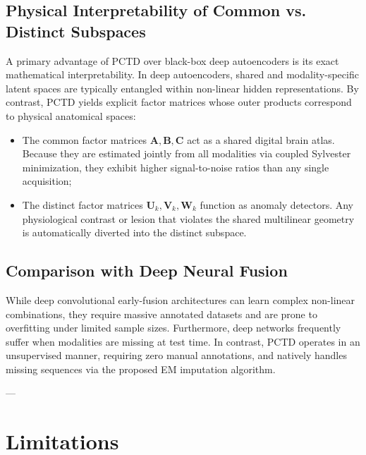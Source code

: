 \documentclass[11pt,a4paper]{article}
\begin{document}
\subsection{Physical Interpretability of Common vs. Distinct Subspaces}
A primary advantage of PCTD over black-box deep autoencoders is its exact mathematical interpretability. In deep autoencoders, shared and modality-specific latent spaces are typically entangled within non-linear hidden representations. By contrast, PCTD yields explicit factor matrices whose outer products correspond to physical anatomical spaces:
\begin{itemize}
    \item The common factor matrices $\mathbf{A}, \mathbf{B}, \mathbf{C}$ act as a shared digital brain atlas. Because they are estimated jointly from all modalities via coupled Sylvester minimization, they exhibit higher signal-to-noise ratios than any single acquisition;
    \item The distinct factor matrices $\mathbf{U}_k, \mathbf{V}_k, \mathbf{W}_k$ function as anomaly detectors. Any physiological contrast or lesion that violates the shared multilinear geometry is automatically diverted into the distinct subspace.
\end{itemize}

\subsection{Comparison with Deep Neural Fusion}
While deep convolutional early-fusion architectures can learn complex non-linear combinations, they require massive annotated datasets and are prone to overfitting under limited sample sizes. Furthermore, deep networks frequently suffer when modalities are missing at test time. In contrast, PCTD operates in an unsupervised manner, requiring zero manual annotations, and natively handles missing sequences via the proposed EM imputation algorithm.

---

\section{Limitations}
\label{sec:limitations}
\end{document}
